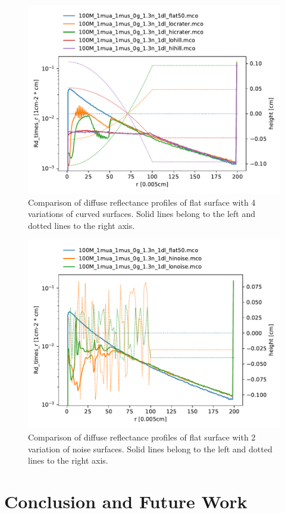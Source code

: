 \documentclass[]{article}
\begin{document}
\begin{figure}[ht!]
	\includegraphics[width=\linewidth]{img/result2.pdf}
	\caption{Comparison of diffuse reflectance profiles of flat surface with 4 variations of curved surfaces. Solid lines belong to the left and dotted lines to the right axis.}
	\label{result2}
\end{figure}

\begin{figure}[ht!]
\includegraphics[width=\linewidth]{img/result3.pdf}
\caption{Comparison of diffuse reflectance profiles of flat surface with 2 variation of noise surfaces. Solid lines belong to the left and dotted lines to the right axis.}
\label{result3}
\end{figure}

\section{Conclusion and Future Work}

\FloatBarrier

\end{document}
